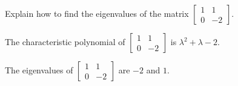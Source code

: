 
\begin{exerciseStatement}


Explain how to find the eigenvalues of the matrix \( \left[\begin{array}{cc}
1 & 1 \\
0 & -2
\end{array}\right] \).


\end{exerciseStatement}
    
\begin{exerciseAnswer} 


The characteristic polynomial of \( \left[\begin{array}{cc}
1 & 1 \\
0 & -2
\end{array}\right] \) is \( \lambda^{2} + \lambda - 2 \).



The eigenvalues of \( \left[\begin{array}{cc}
1 & 1 \\
0 & -2
\end{array}\right] \) are \( -2 \) and \( 1 \).


\end{exerciseAnswer}
    
